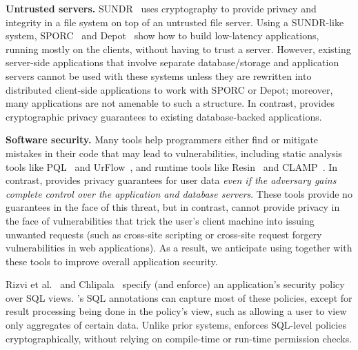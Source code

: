 
{\bf Untrusted servers.}
SUNDR~\cite{li:sundr} uses cryptography to provide privacy and
integrity in a file system on top of an untrusted file server.  Using
a SUNDR-like system, SPORC~\cite{feldman:sporc} and
Depot~\cite{mahajan:depot} show how to build low-latency applications,
running mostly on the clients, without having to trust a server.
However, existing server-side applications that involve separate
database/storage and application servers cannot be used with these
systems unless they are rewritten into distributed client-side
applications to work with SPORC or Depot; moreover, many applications
are not amenable to such a structure.
In contrast, \name{} provides cryptographic privacy guarantees to
existing database-backed applications.



{\bf Software security.}  Many tools help programmers either find or
mitigate mistakes in their code that may lead to vulnerabilities,
including static analysis tools like PQL~\cite{livshits:javasec, martin:pql} and
UrFlow~\cite{chlipala:urflow}, and runtime tools like
Resin~\cite{yip:resin} and CLAMP~\cite{parno:clamp}.
In contrast, \name{} provides privacy guarantees for user data
\textit{even if the adversary gains complete control over the
  application and database servers}.  These tools provide no
guarantees in the face of this threat, but in contrast, \name cannot
provide privacy in the face of vulnerabilities that trick the user's
client machine into issuing unwanted requests (such as cross-site
scripting or cross-site request forgery vulnerabilities in web
applications).  As a result, we anticipate using \name{} together with
these tools to improve overall application security.

Rizvi et al.~\cite{rizvi:fine-grained} and
Chlipala~\cite{chlipala:urflow} specify (and enforce) an application's
security policy over SQL views.  \name{}'s SQL annotations can capture
most of these policies, except for result processing being done in the
policy's view, such as allowing a user to view only aggregates of
certain data.  Unlike prior systems, \name{} enforces SQL-level
policies cryptographically, without relying on compile-time or
run-time permission checks.

